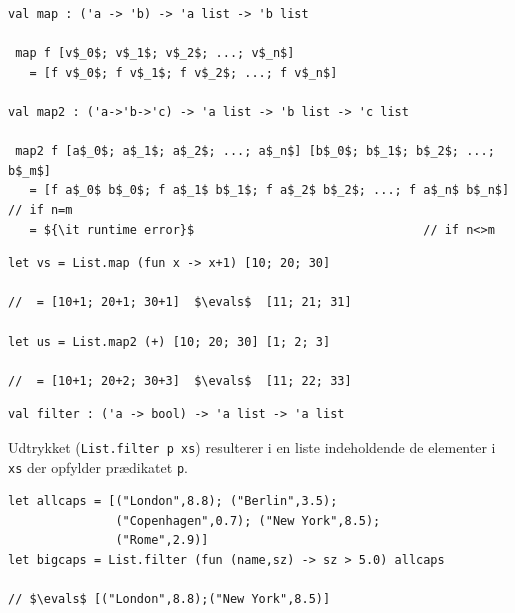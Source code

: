 \documentclass[rgb]{beamer}
\begin{document}
\begin{frame}[fragile]
\begin{footnotesize}
\vspace{0.5ex}

\begin{lstlisting}[numbers=none,frame=none,mathescape]
val map : ('a -> 'b) -> 'a list -> 'b list

 map f [v$_0$; v$_1$; v$_2$; ...; v$_n$]
   = [f v$_0$; f v$_1$; f v$_2$; ...; f v$_n$]

val map2 : ('a->'b->'c) -> 'a list -> 'b list -> 'c list

 map2 f [a$_0$; a$_1$; a$_2$; ...; a$_n$] [b$_0$; b$_1$; b$_2$; ...; b$_m$]
   = [f a$_0$ b$_0$; f a$_1$ b$_1$; f a$_2$ b$_2$; ...; f a$_n$ b$_n$]   // if n=m
   = ${\it runtime error}$                                // if n<>m
\end{lstlisting}

\vspace{0.5ex}
\begin{lstlisting}[numbers=none,frame=none,mathescape]
let vs = List.map (fun x -> x+1) [10; 20; 30]

//  = [10+1; 20+1; 30+1]  $\evals$  [11; 21; 31]

let us = List.map2 (+) [10; 20; 30] [1; 2; 3]

//  = [10+1; 20+2; 30+3]  $\evals$  [11; 22; 33]
\end{lstlisting}

\end{footnotesize}
\end{frame}

\begin{frame}[fragile]
\begin{footnotesize}

\vspace{1ex}

\begin{lstlisting}[numbers=none,frame=none,mathescape]
val filter : ('a -> bool) -> 'a list -> 'a list
\end{lstlisting}

\vspace{1ex}

Udtrykket (\lstinline{List.filter p xs}) resulterer i en liste
indeholdende de elementer i \lstinline{xs} der opfylder prædikatet
\lstinline{p}.

\vspace{1ex}
\vspace{1ex}
\begin{lstlisting}[numbers=none,frame=none,mathescape]
let allcaps = [("London",8.8); ("Berlin",3.5);
               ("Copenhagen",0.7); ("New York",8.5);
               ("Rome",2.9)]
let bigcaps = List.filter (fun (name,sz) -> sz > 5.0) allcaps

// $\evals$ [("London",8.8);("New York",8.5)]
\end{lstlisting}

\end{footnotesize}
\end{frame}
\end{document}
